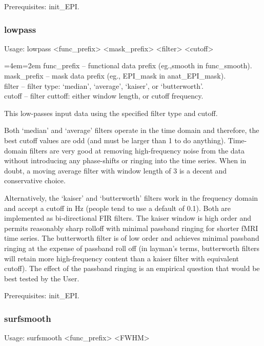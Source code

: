 \documentclass[final,titlepage,letterpaper,oneside,12pt]{article}
\renewcommand{\texttt}[2][BrickRed]{\textcolor{#1}{\ttfamily #2}}%
\newenvironment{blockquote}{%
  \par%
  \medskip
  \leftskip=4em\rightskip=2em%
  \noindent\ignorespaces}{%
  \par\medskip}
\begin{document}
Prerequisites: \texttt{init\_EPI}.

\subsubsection{lowpass}
Usage: \texttt{lowpass <func\_prefix> <mask\_prefix> <filter> <cutoff>}

\begin{blockquote}
func\_prefix -- functional data prefix (eg.,smooth in func\_smooth). \\
mask\_prefix -- mask data prefix (eg., EPI\_mask in anat\_EPI\_mask). \\
filter -- filter type: `median', `average', `kaiser', or `butterworth'. \\
cutoff -- filter cuttoff: either window length, or cutoff frequency. \
\end{blockquote}

\noindent This low-passes input data using the specified filter type and cutoff. 

Both `median' and `average' filters operate in the time domain and therefore, the best cutoff values are odd (and must be larger than 1 to do anything). Time-domain filters are very good at removing high-frequency noise from the data without introducing any phase-shifts or ringing into the time series. When in doubt, a moving average filter with window length of 3 is a decent and conservative choice.

Alternatively, the `kaiser' and `butterworth' filters work in the frequency domain and accept a cutoff in Hz (people tend to use a default of 0.1). Both are implemented as bi-directional FIR filters. The kaiser window is high order and permits reasonably sharp rolloff with minimal passband ringing for shorter fMRI time series. The butterworth filter is of low order and achieves minimal passband ringing at the expense of passband roll off (in layman's terms, butterworth filters will retain more high-frequency content than a kaiser filter with equivalent cutoff). The effect of the passband ringing is an empirical question that would be best tested by the User.

Prerequisites: \texttt{init\_EPI}.

\subsubsection{surfsmooth}
Usage: \texttt{surfsmooth <func\_prefix> <FWHM>}
\end{document}

